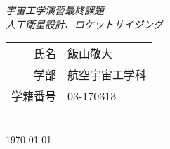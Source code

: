 
\begin{titlepage}
\begin{center}
\vspace*{30mm}
{\huge\itshape 宇宙工学演習最終課題 \vspace{10mm}\\ 人工衛星設計、ロケットサイジング}
\vspace{30mm} \\
\large
\begin{tabular}{rl}
氏名 & 飯山敬大\\
学部 & 航空宇宙工学科\\
学籍番号 & 03-170313
\end{tabular} \vspace{10mm} \\
\today \vspace{12pt} \\
\end{center}
\end{titlepage}
